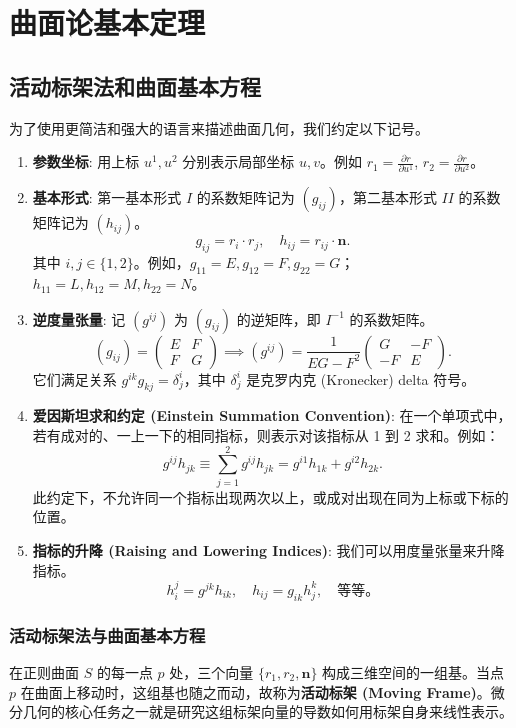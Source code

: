 \documentclass[lang=cn,10pt,thmcnt=section]{elegantbook}
\renewcommand{\vec}[1]{\mathbf{#1}}
\begin{document}
\chapter{曲面论基本定理}
\section{活动标架法和曲面基本方程}
为了使用更简洁和强大的语言来描述曲面几何，我们约定以下记号。
\begin{enumerate}
    \item \textbf{参数坐标}: 用上标 $u^1, u^2$ 分别表示局部坐标 $u, v$。例如 $r_1 = \frac{\partial r}{\partial u^1}$, $r_2 = \frac{\partial r}{\partial u^2}$。
    
    \item \textbf{基本形式}: 
    第一基本形式 $I$ 的系数矩阵记为 $(g_{ij})$，第二基本形式 $II$ 的系数矩阵记为 $(h_{ij})$。
    \[
    g_{ij} = r_i \cdot r_j, \quad h_{ij} = r_{ij} \cdot \vec{n}.
    \]
    其中 $i,j \in \{1,2\}$。例如，$g_{11}=E, g_{12}=F, g_{22}=G$；$h_{11}=L, h_{12}=M, h_{22}=N$。

    \item \textbf{逆度量张量}: 记 $(g^{ij})$ 为 $(g_{ij})$ 的逆矩阵，即 $I^{-1}$ 的系数矩阵。
    \[
    (g_{ij}) = \begin{pmatrix} E & F \\ F & G \end{pmatrix} \implies (g^{ij}) = \frac{1}{EG - F^2} \begin{pmatrix} G & -F \\ -F & E \end{pmatrix}.
    \]
    它们满足关系 $g^{ik} g_{kj} = \delta_j^i$，其中 $\delta_j^i$ 是克罗内克 (Kronecker) delta 符号。

    \item \textbf{爱因斯坦求和约定 (Einstein Summation Convention)}: 在一个单项式中，若有成对的、一上一下的相同指标，则表示对该指标从 1 到 2 求和。例如：
    \[
    g^{ij}h_{jk} \equiv \sum_{j=1}^{2} g^{ij} h_{jk} = g^{i1} h_{1k} + g^{i2} h_{2k}.
    \]
    此约定下，不允许同一个指标出现两次以上，或成对出现在同为上标或下标的位置。

    \item \textbf{指标的升降 (Raising and Lowering Indices)}: 我们可以用度量张量来升降指标。
    \[
    h_i^j = g^{jk} h_{ik}, \quad h_{ij} = g_{ik} h_j^k, \quad \text{等等。}
    \]
\end{enumerate}
\subsection{活动标架法与曲面基本方程}
在正则曲面 $S$ 的每一点 $p$ 处，三个向量 $\{r_1, r_2, \vec{n}\}$ 构成三维空间的一组基。当点 $p$ 在曲面上移动时，这组基也随之而动，故称为\textbf{活动标架 (Moving Frame)}。微分几何的核心任务之一就是研究这组标架向量的导数如何用标架自身来线性表示。
\end{document}
